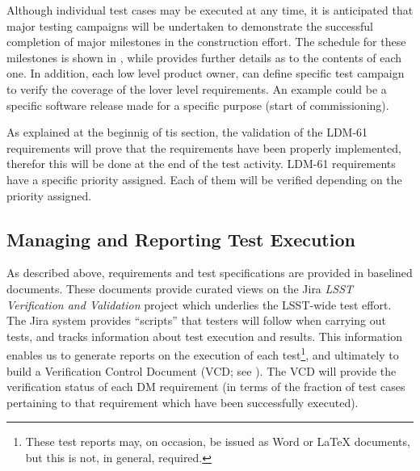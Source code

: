 
Although individual test cases may be executed at any time, it is anticipated that major testing campaigns will be undertaken to demonstrate the successful completion of major milestones in the \product{} construction effort.
The schedule for these milestones is shown in , while  provides further details as to the contents of each one.
In addition, each low level product owner, can define specific test campaign to verify the coverage of the lover level requirements.
An example could be a specific software release made for a specific purpose (start of commissioning).

As explained at the beginnig of tis section, the validation of the LDM-61 requirements will prove that the \product{} requirements have been properly implemented, therefor this will be done at the end of the test activity.
LDM-61 requirements have a specific priority assigned. Each of them will be verified depending on the priority assigned.

\subsection{Managing and Reporting Test Execution}
\label{sect:reports}

As described above, requirements and test specifications are provided in baselined documents.
These documents provide curated views on the Jira \emph{LSST Verification and Validation} project which underlies the LSST-wide test effort.
The Jira system provides ``scripts'' that testers will follow when carrying out tests, and tracks information about test execution and results.
This information enables us to generate reports on the execution of each test\footnote{These test reports may, on occasion, be issued as Word or LaTeX documents, but this is not, in general, required.}, and ultimately to build a Verification Control Document (VCD; see ).
The VCD will provide the verification status of each DM requirement (in terms of the fraction of test cases pertaining to that requirement which have been successfully executed).

